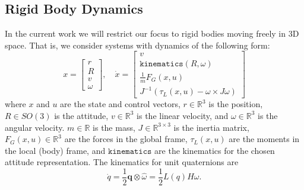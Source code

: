 \documentclass{svproc}
\newcommand{\half}{\frac{1}{2}}
\newcommand{\R}{\mathbb{R}}
\newcommand{\skewmat}[1]{[#1]^\times}
\newcommand{\q}{\textbf{q}}
\newcommand{\todo}[1]{\textcolor{red}{TODO: #1}}
\begin{document}
    \subsection{Rigid Body Dynamics} \label{sec:rigidbody_dynamics}
        In the current work we will restrict our focus to rigid bodies moving freely in 3D space. That is, we consider systems with dynamics of the following form:
        \begin{equation} \label{eq:rigid_body_dynamics}
            x = \begin{bmatrix} r \\ R \\ v \\ \omega \end{bmatrix}, \quad 
            \dot{x} = \begin{bmatrix} 
                v \\ 
                \texttt{kinematics}(R,\omega) \\ 
                \frac{1}{m} F_G(x,u) \\ 
                J^{-1}(\tau_L(x,u) - \omega \times J \omega) 
            \end{bmatrix}
        \end{equation}
        where $x$ and $u$ are the state and control vectors, $r \in \R^3$ is the position, $R \in SO(3)$ is the attitude, $v \in \R^3$ is the linear velocity, and $\omega \in \R^3$ is the angular velocity. $m \in \R$ is the mass, $J \in \R^{3\times3}$ is the inertia matrix, $F_G(x,u) \in \R^3$ are the forces in the global frame, $\tau_L(x,u)$ are the moments in the local (body) frame, and $\texttt{kinematics}$ are the kinematics for the chosen attitude representation. The kinematics for unit quaternions are
        \begin{equation}
            \dot{q} = \half \q \otimes \hat{\omega} = \half L(q) H \omega.
        \end{equation}
        
\end{document}

